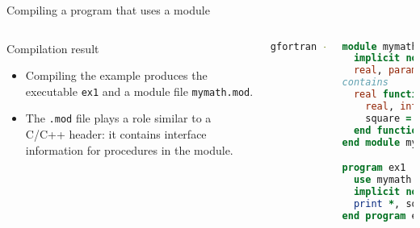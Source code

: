 \begin{frame}[fragile]{Compiling a program that uses a module}
  \begin{columns}[T]
    \begin{block}{Compilation result}
      \begin{itemize}
        \item Compiling the example produces the executable \texttt{ex1} and a module file \texttt{mymath.mod}.
        \item The \texttt{.mod} file plays a role similar to a C/C++ header: it contains interface information for procedures in the module.
      \end{itemize}
    \end{block}

\begin{lstlisting}[language=bash]
gfortran -o ex1 ex1.f90
\end{lstlisting}

\begin{lstlisting}[language=Fortran]
module mymath
  implicit none
  real, parameter :: pi = 3.14
contains
  real function square(a)
    real, intent(in) :: a
    square = a**2
  end function square
end module mymath

program ex1
  use mymath
  implicit none
  print *, square(2.3), pi
end program ex1
\end{lstlisting}
  \end{columns}
\end{frame}

